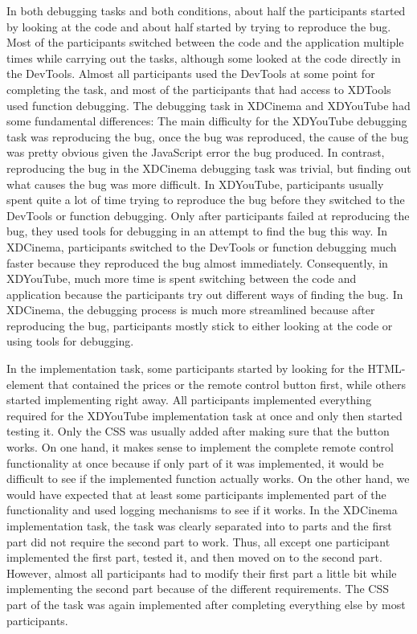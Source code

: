 In both debugging tasks and both conditions, about half the participants started by looking at the code and about half started by trying to reproduce the bug. Most of the participants switched between the code and the application multiple times while carrying out the tasks, although some looked at the code directly in the DevTools. Almost all participants used the DevTools at some point for completing the task, and most of the participants that had access to XDTools used function debugging. The debugging task in XDCinema and XDYouTube had some fundamental differences: The main difficulty for the XDYouTube debugging task was reproducing the bug, once the bug was reproduced, the cause of the bug was pretty obvious given the JavaScript error the bug produced. In contrast, reproducing the bug in the XDCinema debugging task was trivial, but finding out what causes the bug was more difficult. In XDYouTube, participants usually spent quite a lot of time trying to reproduce the bug before they switched to the DevTools or function debugging. Only after participants failed at reproducing the bug, they used tools for debugging in an attempt to find the bug this way. In XDCinema, participants switched to the DevTools or function debugging much faster because they reproduced the bug almost immediately. Consequently, in XDYouTube, much more time is spent switching between the code and application because the participants try out different ways of finding the bug. In XDCinema, the debugging process is much more streamlined because after reproducing the bug, participants mostly stick to either looking at the code or using tools for debugging.

In the implementation task, some participants started by looking for the HTML-element that contained the prices or the remote control button first, while others started implementing right away. All participants implemented everything required for the XDYouTube implementation task at once and only then started testing it. Only the CSS was usually added after making sure that the button works. On one hand, it makes sense to implement the complete remote control functionality at once because if only part of it was implemented, it would be difficult to see if the implemented function actually works. On the other hand, we would have expected that at least some participants implemented part of the functionality and used logging mechanisms to see if it works. In the XDCinema implementation task, the task was clearly separated into to parts and the first part did not require the second part to work. Thus, all except one participant implemented the first part, tested it, and then moved on to the second part. However, almost all participants had to modify their first part a little bit while implementing the second part because of the different requirements. The CSS part of the task was again implemented after completing everything else by most participants.

